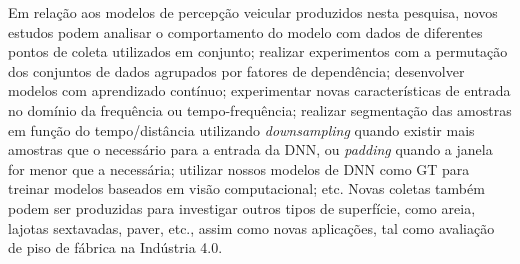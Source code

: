Em relação aos modelos de percepção veicular produzidos nesta pesquisa, novos estudos podem analisar o comportamento do modelo com dados de diferentes pontos de coleta utilizados em conjunto; realizar experimentos com a permutação dos conjuntos de dados agrupados por fatores de dependência; desenvolver modelos com aprendizado contínuo; experimentar novas características de entrada no domínio da frequência ou tempo-frequência; realizar segmentação das amostras em função do tempo/distância utilizando \textit{downsampling} quando existir mais amostras que o necessário para a entrada da DNN, ou \textit{padding} quando a janela for menor que a necessária; utilizar nossos modelos de DNN como GT para treinar modelos baseados em visão computacional; etc. Novas coletas também podem ser produzidas para investigar outros tipos de superfície, como areia, lajotas sextavadas, paver, etc., assim como novas aplicações, tal como avaliação de piso de fábrica na Indústria 4.0.

